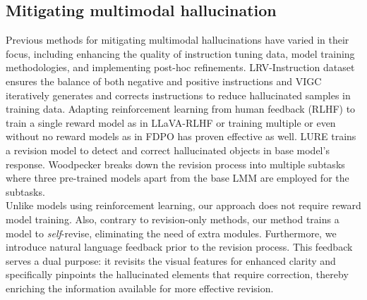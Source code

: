 \documentclass[11pt]{article}
\begin{document}
\subsection{Mitigating multimodal hallucination} 
\label{subsec:mitigating}
Previous methods for mitigating multimodal hallucinations have varied in their focus, including enhancing the quality of instruction tuning data,  model training methodologies, and implementing post-hoc refinements. LRV-Instruction dataset \citep{liu2023mitigating} ensures the balance of both negative and positive instructions and VIGC \citep{wang2023vigc} iteratively generates and corrects instructions to reduce hallucinated samples in training data. Adapting reinforcement learning from human feedback (RLHF) to train a single reward model as in LLaVA-RLHF \citep{sun2023aligning} or training multiple or even without no reward models as in FDPO \citep{gunjal2023detecting} has proven effective as well. LURE \citep{zhou2023analyzing} trains a revision model to detect and correct hallucinated objects in base model's response. Woodpecker \citep{yin2023woodpecker} breaks down the revision process into multiple subtasks where three pre-trained models apart from the base LMM are employed for the subtasks. \\
Unlike models using reinforcement learning, our approach does not require reward model training. Also, contrary to revision-only methods, our method trains a model to \textit{self}-revise, eliminating the need of extra modules. Furthermore, we introduce natural language feedback prior to the revision process. This feedback serves a dual purpose: it revisits the visual features for enhanced clarity and specifically pinpoints the hallucinated elements that require correction, thereby enriching the information available for more effective revision.
\end{document}
